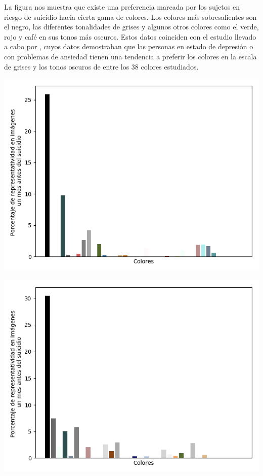 \documentclass[12pt, man, donotrepeattitle, letterpaper]{apa6}
\begin{document}
    La figura nos muestra que existe una preferencia marcada por los sujetos en riesgo de suicidio hacia cierta gama de colores. Los colores más sobresalientes son el negro, las diferentes tonalidades de grises y algunos otros colores como el verde, rojo y café en sus tonos más oscuros. Estos datos coinciden con el estudio llevado a cabo por \textcite{Carruthers2010}, cuyos datos demostraban que las personas en estado de depresión o con problemas de ansiedad tienen una tendencia a preferir los colores en la escala de grises y los tonos oscuros de entre los 38 colores estudiados.
    
    \begin{center}
        \begin{minipage}{0.3\linewidth}
            \includegraphics[width=\linewidth]{images/colors_angie}
        \end{minipage}
        \begin{minipage}{0.3\linewidth}
            \includegraphics[width=\linewidth]{images/colors_juan}

\end{minipage}
\end{center}
\end{document}
